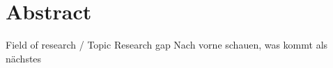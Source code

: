\chapter{Abstract}

Field of research / Topic
Research gap
Nach vorne schauen, was kommt als nächstes
